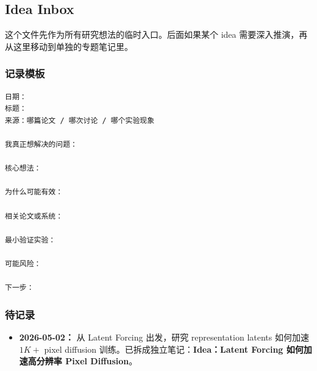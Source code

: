 \subsection*{Idea Inbox}
{}

\begin{summarybox}
这个文件先作为所有研究想法的临时入口。后面如果某个 idea 需要深入推演，再从这里移动到单独的专题笔记里。
\end{summarybox}

\subsubsection*{记录模板}

\begin{lstlisting}[language={},basicstyle=\ttfamily\small]
日期：
标题：
来源：哪篇论文 / 哪次讨论 / 哪个实验现象

我真正想解决的问题：

核心想法：

为什么可能有效：

相关论文或系统：

最小验证实验：

可能风险：

下一步：
\end{lstlisting}

\subsubsection*{待记录}

\begin{itemize}[leftmargin=1.5em]
  \item \textbf{2026-05-02：} 从 Latent Forcing 出发，研究 representation latents 如何加速 $1K+$ pixel diffusion 训练。已拆成独立笔记：\textbf{Idea：Latent Forcing 如何加速高分辨率 Pixel Diffusion}。
\end{itemize}
